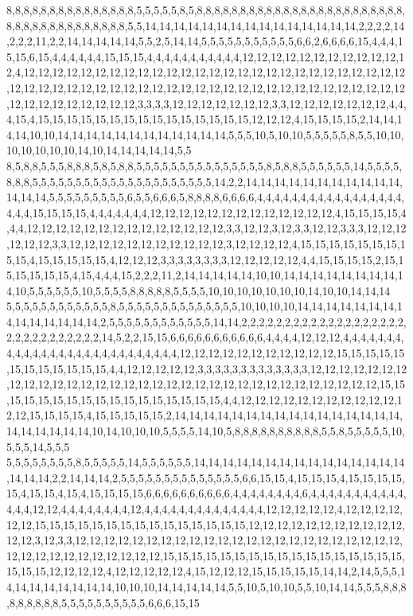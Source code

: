 8,8,8,8,8,8,8,8,8,8,8,8,8,8,8,5,5,5,5,5,8,5,8,8,8,8,8,8,8,8,8,8,8,8,8,8,8,8,8,8,8,8,8,8,8,8,8,8,8,8,8,8,8,8,8,8,8,8,8,8,5,5,14,14,14,14,14,14,14,14,14,14,14,14,14,14,14,2,2,2,2,14,2,2,2,11,2,2,14,14,14,14,14,5,5,2,5,14,14,5,5,5,5,5,5,5,5,5,5,5,6,6,2,6,6,6,6,15,4,4,4,15,15,6,15,4,4,4,4,4,4,15,15,15,4,4,4,4,4,4,4,4,4,4,4,12,12,12,12,12,12,12,12,12,12,12,12,4,12,12,12,12,12,12,12,12,12,12,12,12,12,12,12,12,12,12,12,12,12,12,12,12,12,12,12,12,12,12,12,12,12,12,12,12,12,12,12,12,12,12,12,12,12,12,12,12,12,12,12,12,12,12,12,12,12,12,12,12,12,12,12,12,3,3,3,3,12,12,12,12,12,12,12,3,3,12,12,12,12,12,12,12,4,4,4,15,4,15,15,15,15,15,15,15,15,15,15,15,15,15,15,15,12,12,12,4,15,15,15,15,2,14,14,14,14,10,10,14,14,14,14,14,14,14,14,14,14,14,14,5,5,5,10,5,10,10,5,5,5,5,5,8,5,5,10,10,10,10,10,10,10,14,10,14,14,14,14,14,5,5
8,5,8,8,5,5,5,8,8,8,5,8,5,8,8,5,5,5,5,5,5,5,5,5,5,5,5,5,5,5,8,5,8,8,5,5,5,5,5,5,14,5,5,5,5,8,8,8,5,5,5,5,5,5,5,5,5,5,5,5,5,5,5,5,5,5,5,5,5,14,2,2,14,14,14,14,14,14,14,14,14,14,14,14,14,14,5,5,5,5,5,5,5,5,5,6,5,5,6,6,6,5,8,8,8,8,6,6,6,6,4,4,4,4,4,4,4,4,4,4,4,4,4,4,4,4,4,4,4,4,15,15,15,15,4,4,4,4,4,4,4,12,12,12,12,12,12,12,12,12,12,12,12,12,4,15,15,15,15,4,4,4,12,12,12,12,12,12,12,12,12,12,12,12,12,12,3,3,12,12,3,12,3,3,12,12,3,3,3,12,12,12,12,12,12,3,3,12,12,12,12,12,12,12,12,12,12,12,3,12,12,12,12,4,15,15,15,15,15,15,15,15,15,4,15,15,15,15,15,4,12,12,12,3,3,3,3,3,3,3,3,12,12,12,12,12,4,4,15,15,15,15,2,15,15,15,15,15,15,4,15,4,4,4,15,2,2,2,11,2,14,14,14,14,14,10,10,14,14,14,14,14,14,14,14,14,10,5,5,5,5,5,5,10,5,5,5,5,8,8,8,8,8,5,5,5,5,10,10,10,10,10,10,10,14,10,10,14,14,14
5,5,5,5,5,5,5,5,5,5,5,5,8,5,5,5,5,5,5,5,5,5,5,5,5,5,5,10,10,10,10,14,14,14,14,14,14,14,14,14,14,14,14,14,14,2,5,5,5,5,5,5,5,5,5,5,5,5,14,14,2,2,2,2,2,2,2,2,2,2,2,2,2,2,2,2,2,2,2,2,2,2,2,2,2,2,2,2,2,2,14,5,2,2,15,15,6,6,6,6,6,6,6,6,6,6,6,4,4,4,4,12,12,12,4,4,4,4,4,4,4,4,4,4,4,4,4,4,4,4,4,4,4,4,4,4,4,4,4,4,4,12,12,12,12,12,12,12,12,12,12,12,15,15,15,15,15,15,15,15,15,15,15,15,4,4,12,12,12,12,12,3,3,3,3,3,3,3,3,3,3,3,3,3,12,12,12,12,12,12,12,12,12,12,12,12,12,12,12,12,12,12,12,12,12,12,12,12,12,12,12,12,12,12,12,12,12,15,15,15,15,15,15,15,15,15,15,15,15,15,15,15,15,15,4,4,12,12,12,12,12,12,12,12,12,12,12,12,12,15,15,15,15,4,15,15,15,15,15,2,14,14,14,14,14,14,14,14,14,14,14,14,14,14,14,14,14,14,14,14,14,14,10,14,10,10,10,5,5,5,5,14,10,5,8,8,8,8,8,8,8,8,8,8,5,5,8,5,5,5,5,5,10,5,5,5,14,5,5,5
5,5,5,5,5,5,5,5,8,5,5,5,5,5,14,5,5,5,5,5,5,14,14,14,14,14,14,14,14,14,14,14,14,14,14,14,14,14,14,2,2,14,14,14,2,5,5,5,5,5,5,5,5,5,5,5,5,5,5,6,6,15,15,4,15,15,15,4,15,15,15,15,15,4,15,15,4,15,4,15,15,15,15,6,6,6,6,6,6,6,6,6,6,4,4,4,4,4,4,4,4,6,4,4,4,4,4,4,4,4,4,4,4,4,4,4,12,12,4,4,4,4,4,4,4,4,12,4,4,4,4,4,4,4,4,4,4,4,4,4,4,12,12,12,12,12,4,12,12,12,12,12,12,15,15,15,15,15,15,15,15,15,15,15,15,15,15,15,12,12,12,12,12,12,12,12,12,12,12,12,12,3,12,3,3,12,12,12,12,12,12,12,12,12,12,12,12,12,12,12,12,12,12,12,12,12,12,12,12,12,12,12,12,12,12,12,12,12,12,15,15,15,15,15,15,15,15,15,15,15,15,15,15,15,15,15,15,15,15,12,12,12,12,4,12,12,12,12,12,4,15,12,12,12,15,15,15,15,15,14,14,2,14,5,5,5,14,14,14,14,14,14,14,14,10,10,10,14,14,14,14,14,5,5,10,5,10,10,5,5,10,14,14,5,5,5,8,8,8,8,8,8,8,8,8,5,5,5,5,5,5,5,5,5,5,6,6,6,15,15
